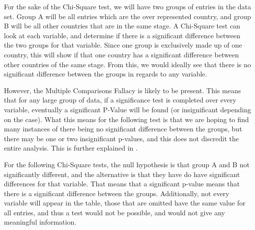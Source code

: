 \documentclass{article} %
\begin{document}
For the sake of the Chi-Square test, we will have two groups of entries in the data set. Group A will be all entries which are the over represented country, and group B will be all other countries that are in the same stage. A Chi-Square test can look at each variable, and determine if there is a significant difference between the two groups for that variable. Since one group is exclusively made up of one country, this will show if that one country has a significant difference between other countries of the same stage. From this, we would ideally see that there is no significant difference between the groups in regards to any variable. 

However, the Multiple Comparisons Fallacy is likely to be present. This means that for any large group of data, if a significance test is completed over every variable, eventually a significant P-Value will be found (or insignificant depending on the case). What this means for the following test is that we are hoping to find many instances of there being no significant difference between the groups, but there may be one or two insignificant p-values, and this does not discredit the entire analysis. This is further explained in \cite{Fallacy}.

For the following Chi-Square tests, the null hypothesis is that group A and B not significantly different, and the alternative is that they have do have significant differences for that variable. That means that a significant p-value means that there is a significant difference between the groups. Additionally, not every variable will appear in the table, those that are omitted have the same value for all entries, and thus a test would not be possible, and would not give any meaningful information.
\end{document}
